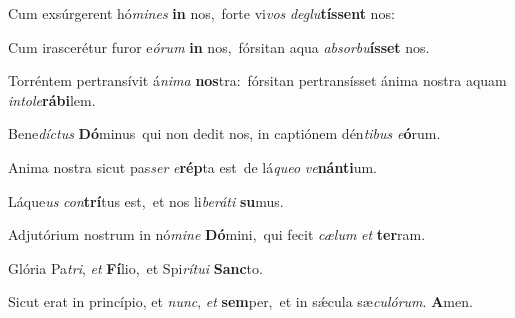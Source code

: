 Cum exsúrgerent hó\textit{mi}\textit{nes} \textbf{in} nos,~\redgreheightstar forte vi\textit{vos} \textit{de}\textit{glu}\textbf{tís}\textbf{sent} nos:

Cum irascerétur furor e\textit{ó}\textit{rum} \textbf{in} nos,~\redgreheightstar fórsitan aqua \textit{ab}\textit{sor}\textit{bu}\textbf{ís}\textbf{set} nos.

Torréntem pertransívit á\textit{ni}\textit{ma} \textbf{nos}tra:~\redgreheightstar fórsitan pertransísset ánima nostra aquam \textit{in}\textit{to}\textit{le}\textbf{rá}\textbf{bi}lem.

Bene\textit{díc}\textit{tus} \textbf{Dó}minus~\redgreheightstar qui non dedit nos, in captiónem dén\textit{ti}\textit{bus} \textit{e}\textbf{ó}rum.

Anima nostra sicut pas\textit{ser} \textit{e}\textbf{rép}ta est~\redgreheightstar de lá\textit{que}\textit{o} \textit{ve}\textbf{nán}\textbf{ti}um.

Láque\textit{us} \textit{con}\textbf{trí}tus est,~\redgreheightstar et nos li\textit{be}\textit{rá}\textit{ti} \textbf{su}mus.

Adjutórium nostrum in nó\textit{mi}\textit{ne} \textbf{Dó}mini,~\redgreheightstar qui fecit \textit{cæ}\textit{lum} \textit{et} \textbf{ter}ram.

Glória Pa\textit{tri}, \textit{et} \textbf{Fí}lio,~\redgreheightstar et Spi\textit{rí}\textit{tu}\textit{i} \textbf{Sanc}to.

Sicut erat in princípio, et \textit{nunc}, \textit{et} \textbf{sem}per,~\redgreheightstar et in sǽcula sæ\textit{cu}\textit{ló}\textit{rum}. \textbf{A}men.

